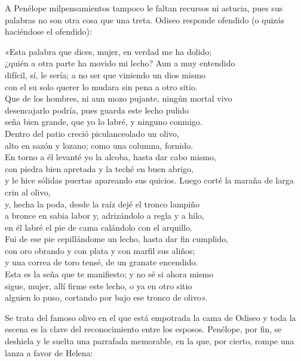 A Penélope milpensamientos tampoco le faltan recursos ni astucia, pues sus palabras no son otra cosa que una treta. Odiseo responde ofendido (o quizás haciéndose el ofendido):

\begin{versocita}
«Esta palabra que dices, mujer, en verdad me ha dolido;\\
¿quién a otra parte ha movido mi lecho? Aun a muy entendido\\
difícil, sí, le sería; a no ser que viniendo un dios mismo\\
con el su solo querer lo mudara sin pena a otro sitio.\\
Que de los hombres, ni aun mozo pujante, ningún mortal vivo\\
desencajarlo podría, pues guarda este lecho pulido\\
seña bien grande, que yo lo labré, y ninguno conmigo.\\
Dentro del patio creció piculanceolado un olivo,\\
alto en sazón y lozano; como una columna, fornido.\\
En torno a él levanté yo la alcoba, hasta dar cabo mismo,\\
con piedra bien apretada y la teché en buen abrigo,\\
y le hice sólidas puertas apareando sus quicios.
\stanzabreak
Luego corté la maraña de larga crin al olivo,\\
y, hecha la poda, desde la raíz dejé el tronco lampiño\\
a bronce en sabia labor y, adrizándolo a regla y a hilo,\\
en él labré el pie de cama calándolo con el arquillo.\\
Fui de ese pie cepillándome un lecho, hasta dar fin cumplido,\\
con oro obrando y con plata y con marfil sus aliños;\\
y una correa de toro tensé, de un granate encendido.\\
Esta es la seña que te manifiesto; y no sé si ahora mismo\\
sigue, mujer, allí firme este lecho, o ya en otro sitio\\
alguien lo puso, cortando por bajo ese tronco de olivo».
\end{versocita}

Se trata del famoso olivo en el que está empotrada la cama de Odiseo y toda la escena es la clave del reconocimiento entre los esposos. Penélope, por fin, se deshiela y le suelta una parrafada memorable, en la que, por cierto, rompe una lanza a favor de Helena:

